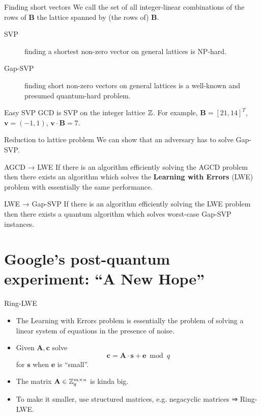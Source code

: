 \documentclass[presentation,smaller]{beamer}
\newcommand{\ZZ}[1][blank]{\ensuremath{\ifthenelse{\equal{#1}{blank}}{\mathbb{Z}}{\mathbb{Z}\left[#1\right]}\xspace}}
\renewcommand{\vec}[1]{\ensuremath{\mathbf{#1}}\xspace}
\begin{document}
\begin{frame}[label={sec:org4282223}]{Finding short vectors}
We call the set of all integer-linear combinations of the rows of \(\vec{B}\) the \alert{lattice} spanned by (the rows of) \(\vec{B}\).

\begin{description}
\item[{SVP}] finding a \alert{shortest} non-zero vector on \alert{general} lattices is NP-hard.

\item[{Gap-SVP}] finding \alert{short} non-zero vectors on \alert{general} lattices is a well-known and presumed quantum-hard problem.
\end{description}

\begin{block}{Easy SVP}
GCD is SVP on the integer lattice \(\ZZ\). For example, \(\vec{B} = {[21, 14]}^T\), \(\vec{v} = (-1,1)\), \(\vec{v} ⋅\vec{B} = 7\).
\end{block}
\end{frame}

\begin{frame}[label={sec:org6140301}]{Reduction to lattice problem}
We can show that an adversary \alert{has} to solve Gap-SVP.

\begin{block}{AGCD → LWE}
If there is an algorithm efficiently solving the AGCD problem then there exists an algorithm which solves the \textbf{Learning with Errors} (LWE) problem with essentially the same performance.  
\end{block}

\begin{block}{LWE → Gap-SVP}
If there is an algorithm efficiently solving the LWE problem then there exists a quantum algorithm which solves worst-case Gap-SVP instances.
\end{block}
\end{frame}

\section{Google’s post-quantum experiment: “A New Hope”}
\label{sec:org2ebc790}

\begin{frame}[label={sec:orga9a2bbc}]{Ring-LWE}
\begin{itemize}
\item The Learning with Errors problem is essentially the problem of solving a linear system of equations in the presence of noise.
\item Given \(\vec{A}, \vec{c}\) solve \[\vec{c} = \vec{A} ⋅ \vec{s} + \vec{e} \bmod q\] for \(\vec{s}\) when \(\vec{e}\) is “small”.
\item The matrix \(\vec{A} \in \ZZ_q^{m \times n}\) is kinda big.
\item To make it smaller, use \alert{structured matrices}, e.g. negacyclic matrices ⇒ Ring-LWE.
\end{itemize}
\end{frame}
\end{document}
